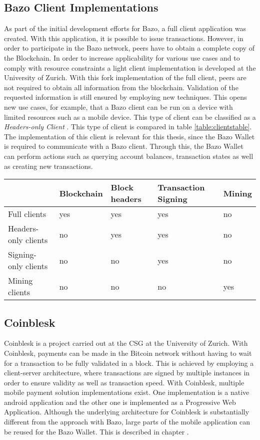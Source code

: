 \subsection{Bazo Client Implementations}
As part of the initial development efforts for Bazo, a full client application was created. With this application, it is possible to issue transactions. However, in order to participate in the Bazo network, peers have to obtain a complete copy of the Blockchain. In order to increase applicability for various use cases and to comply with resource constraints a light client implementation is developed at the University of Zurich. With this fork implementation of the full client, peers are not required to obtain all information from the blockchain. Validation of the requested information is still ensured by employing new techniques. This opens new use cases, for example, that a Bazo client can be run on a device with limited resources such as a mobile device. This type of client can be classified as a \textit{Headers-only Client} \cite{bitcoinclients}. This type of client is compared in table \ref{table:clientstable}.
The implementation of this client is relevant for this thesis, since the Bazo Wallet is required to communicate with a Bazo client. Through this, the Bazo Wallet can perform actions such as querying account balances, transaction states as well as creating new transactions.

\begin{center}\label{table:clientstable}
    \begin{tabular}{ | l | l | l | l | p{3cm} |}
    \hline
      & Blockchain & Block headers & Transaction Signing & Mining \\ \hline
    Full clients  & yes & yes & yes & no \\ \hline
    Headers-only clients  & no & yes & yes & no \\ \hline    
    Signing-only clients  & no & no & yes & no \\ \hline
    Mining clients  & no & no & no & yes \\ \hline
    \end{tabular}

\end{center}
\subsection{Coinblesk}
Coinblesk is a project carried out at the CSG at the University of Zurich. With Coinblesk, payments can be made in the Bitcoin network without having to wait for a transaction to be fully validated in a block. This is achieved by employing a client-server architecture, where transactions are signed by multiple instances in order to ensure validity as well as transaction speed.
With Coinblesk, multiple mobile payment solution implementations exist. One implementation is a native android application and the other one is implemented as a Progressive Web Application. Although the underlying architecture for Coinblesk is substantially different from the approach with Bazo, large parts of the mobile application can be reused for the Bazo Wallet. This is described in chapter \cite{undefined}.
